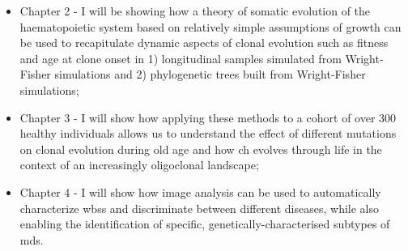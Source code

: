 \begin{itemize}
	\item Chapter 2 - I will be showing how a theory of somatic evolution of the haematopoietic system based on relatively simple assumptions of growth can be used to recapitulate dynamic aspects of clonal evolution such as fitness and age at clone onset in 1) longitudinal samples simulated from Wright-Fisher simulations and 2) phylogenetic trees built from Wright-Fisher simulations;
	\item Chapter 3 - I will show how applying these methods to a cohort of over 300 healthy individuals allows us to understand the effect of different mutations on clonal evolution during old age and how \ac{ch} evolves through life in the context of an increasingly oligoclonal landscape;
	\item Chapter 4 - I will show how image analysis can be used to automatically characterize \acp{wbs} and discriminate between different diseases, while also enabling the identification of specific, genetically-characterised subtypes of \ac{mds}.
\end{itemize}

\begin{figure}[!hb]
  \label{fig:overview}
\end{figure}